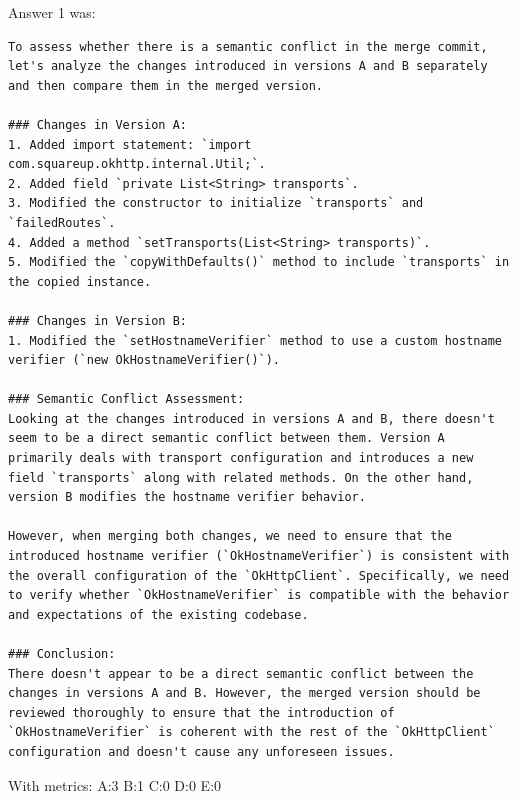 Answer 1 was:
\begin{lstlisting}
To assess whether there is a semantic conflict in the merge commit, let's analyze the changes introduced in versions A and B separately and then compare them in the merged version.

### Changes in Version A:
1. Added import statement: `import com.squareup.okhttp.internal.Util;`.
2. Added field `private List<String> transports`.
3. Modified the constructor to initialize `transports` and `failedRoutes`.
4. Added a method `setTransports(List<String> transports)`.
5. Modified the `copyWithDefaults()` method to include `transports` in the copied instance.

### Changes in Version B:
1. Modified the `setHostnameVerifier` method to use a custom hostname verifier (`new OkHostnameVerifier()`).

### Semantic Conflict Assessment:
Looking at the changes introduced in versions A and B, there doesn't seem to be a direct semantic conflict between them. Version A primarily deals with transport configuration and introduces a new field `transports` along with related methods. On the other hand, version B modifies the hostname verifier behavior.

However, when merging both changes, we need to ensure that the introduced hostname verifier (`OkHostnameVerifier`) is consistent with the overall configuration of the `OkHttpClient`. Specifically, we need to verify whether `OkHostnameVerifier` is compatible with the behavior and expectations of the existing codebase.

### Conclusion:
There doesn't appear to be a direct semantic conflict between the changes in versions A and B. However, the merged version should be reviewed thoroughly to ensure that the introduction of `OkHostnameVerifier` is coherent with the rest of the `OkHttpClient` configuration and doesn't cause any unforeseen issues.
\end{lstlisting}

With metrics:
A:3
B:1
C:0
D:0
E:0

